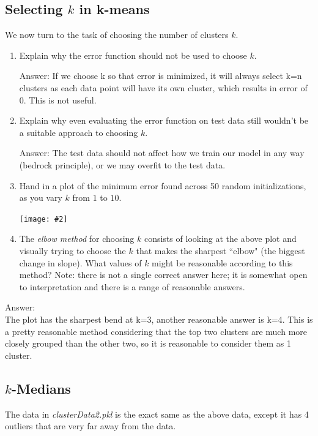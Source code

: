 \documentclass{article}
\def\ans#1{\par\gre{Answer: #1}}
\def\blu#1{{\color{blu}#1}}
\def\gre#1{{\color{gre}#1}}
\newcommand{\centerfig}[2]{\begin{center}\texttt{[image: \#2]}\end{center}}
\def\enum#1{\begin{enumerate}#1\end{enumerate}}
\begin{document}
 \pagebreak

 \subsection{Selecting $k$ in k-means}

 We now turn to the task of choosing the number of clusters $k$.

 \blu{\enum{
 \item Explain why the error function should not be used to choose $k$.
 \ans{If we choose k so that error is minimized, it will always select k=n clusters as each data point will have its own cluster, which results in error of 0. This is not useful.}
 \item Explain why even evaluating the error function on test data still wouldn't be a suitable approach to choosing $k$.
 \ans{The test data should not affect how we train our model in any way (bedrock principle), or we may overfit to the test data.}
 \item Hand in a plot of the minimum error found across 50 random initializations, as you vary $k$ from $1$ to $10$.
 \begin{center}
     \centerfig{.7}{figs/kmeans_lowesterrors.pdf}
 \end{center}
 \item The \emph{elbow method} for choosing $k$ consists of looking at the above plot and visually trying to choose the $k$ that makes the sharpest ``elbow" (the biggest change in slope). What values of $k$ might be reasonable according to this method? Note: there is not a single correct answer here; it is somewhat open to interpretation and there is a range of reasonable answers.
 }}
 \ans{\\
    The plot has the sharpest bend at k=3, another reasonable answer is k=4. This is a pretty reasonable method considering that the top two clusters are much more closely grouped than the other two, so it is reasonable to consider them as 1 cluster.
 }
 

 \pagebreak

 \subsection{$k$-Medians}

 The data in \emph{clusterData2.pkl} is the exact same as the above data, except it has 4 outliers that are very far away from the data.
\end{document}
